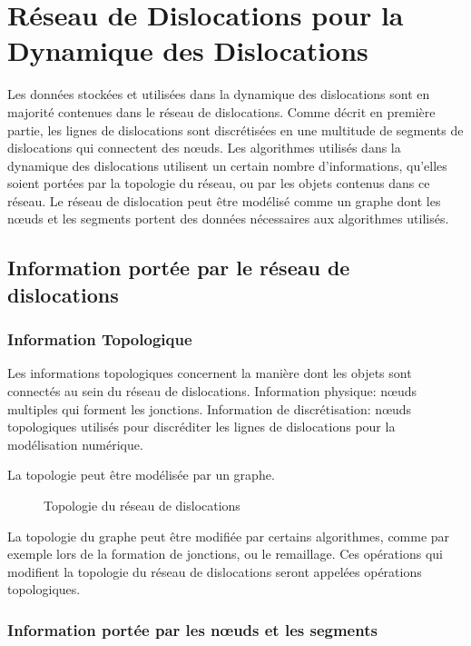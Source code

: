 \documentclass[11pt,class=article,float=false,crop=false]{standalone}
\begin{document}
\section{Réseau de Dislocations pour la Dynamique des Dislocations}

Les données stockées et utilisées dans la dynamique des dislocations sont en majorité contenues dans le réseau de dislocations. Comme décrit en première partie, les lignes de dislocations sont discrétisées en une multitude de segments de dislocations qui connectent des nœuds. Les algorithmes utilisés dans la dynamique des dislocations utilisent un certain nombre d'informations, qu'elles soient portées par la topologie du réseau, ou par les objets contenus dans ce réseau. Le réseau de dislocation peut être modélisé comme un graphe dont les nœuds et les segments portent des données nécessaires aux algorithmes utilisés.

\subsection{Information portée par le réseau de dislocations}

\subsubsection{Information Topologique}

Les informations topologiques concernent la manière dont les objets sont connectés au sein du réseau de dislocations. Information physique: nœuds multiples qui forment les jonctions. Information de discrétisation: nœuds topologiques utilisés pour discréditer les lignes de dislocations pour la modélisation numérique.

La topologie peut être modélisée par un graphe.

\begin{figure}[H]
	\caption{Topologie du réseau de dislocations}
\end{figure}


La topologie du graphe peut être modifiée par certains algorithmes, comme par exemple lors de la formation de jonctions, ou le remaillage. Ces opérations qui modifient la topologie du réseau de dislocations seront appelées opérations topologiques.

\subsubsection{Information portée par les nœuds et les segments}
\label{sec:donnees_noeds_segments}
\end{document}
